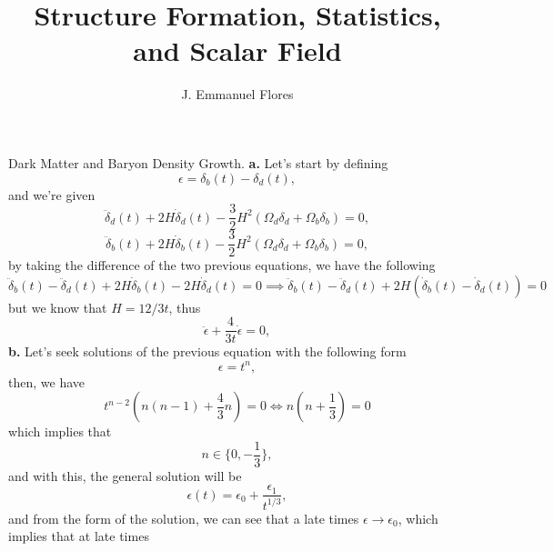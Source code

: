 \documentclass[11pt]{article}
\title{Structure Formation, Statistics, and Scalar Field}
\author{J. Emmanuel Flores}
\begin{document}
\maketitle
\begin{problem}
Dark Matter and Baryon Density Growth.
\newline
\textbf{a.} Let's start by defining 
\begin{displaymath}
  \epsilon = \delta_b(t) - \delta_d(t),
\end{displaymath}
and we're given
\begin{displaymath}
  \ddot\delta_d(t) + 2H\dot\delta_d(t) - \frac{3}{2}H^2(\Omega_d\delta_d +\Omega_b\delta_b)=0,
\end{displaymath}
\begin{displaymath}
  \ddot\delta_b(t) + 2H\dot\delta_b(t) - \frac{3}{2}H^2(\Omega_d\delta_d +\Omega_b\delta_b)=0,
\end{displaymath}
by taking the difference of the two previous equations, we have the following
\begin{displaymath}
  \ddot\delta_b(t)-\ddot\delta_d(t) + 2H\dot\delta_b(t) -2H\dot\delta_d(t)=0\implies \ddot\delta_b(t)-\ddot\delta_d(t) + 2H(\dot\delta_b(t) -\dot\delta_d(t))=0
\end{displaymath}
but we know that $H=12/3t$, thus
\begin{displaymath}
\ddot{\epsilon} + \frac{4}{3t}\dot{\epsilon}=0,
\end{displaymath}
\newline
\textbf{b.} Let's seek solutions of the previous equation with the following form
\begin{displaymath}
  \epsilon =  t^n,
\end{displaymath}
then, we have
\begin{displaymath}
 t^{n-2}\left(n(n-1)+\frac{4}{3}n\right)=0\iff n\left(n+\frac{1}{3}\right) = 0
\end{displaymath}
which implies that
\begin{displaymath}
 n\in\{0,-\frac{1}{3}\},
\end{displaymath}
and with this, the general solution will be
\begin{displaymath}
  \epsilon(t) = \epsilon_0 + \frac{\epsilon_1}{t^{1/3}},
\end{displaymath}
and from the form of the solution, we can see that a late times $\epsilon\rightarrow \epsilon_0$, which implies that at late times
\begin{displaymath}

\end{displaymath}
\end{problem}
\end{document}
